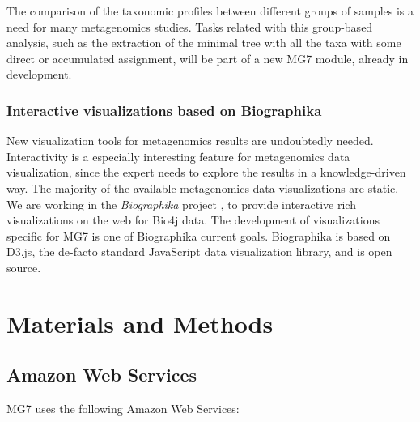 \documentclass[fontsize=8pt,paper=a4,pagesize,abstracton]{scrartcl}
\let\OldHref\href
\renewcommand{\href}[2]{\OldHref[pdfnewwindow]{#1}{{#2}}}
\providecommand{\tightlist}{%
\setlength{\itemsep}{0pt}\setlength{\parskip}{0pt}}
\begin{document}
The comparison of the taxonomic profiles between different groups of
samples is a need for many metagenomics studies. Tasks related with this
group-based analysis, such as the extraction of the minimal tree with
all the taxa with some direct or accumulated assignment, will be part of
a new MG7 module, already in development.

\subsubsection{Interactive visualizations based on
Biographika}\label{interactive-visualizations-based-on-biographika}

New visualization tools for metagenomics results are undoubtedly needed.
Interactivity is a especially interesting feature for metagenomics data
visualization, since the expert needs to explore the results in a
knowledge-driven way. The majority of the available metagenomics data
visualizations are static. We are working in the \emph{Biographika}
project \autocite{tobes2015biographika}, to provide interactive rich
visualizations on the web for Bio4j data. The development of
visualizations specific for MG7 is one of Biographika current goals.
Biographika is based on D3.js, the de-facto standard JavaScript data
visualization library, and is open source.

\section{Materials and Methods}\label{materials-and-methods}

\subsection{Amazon Web Services}\label{amazon-web-services}

MG7 uses the following Amazon Web Services:

\end{document}
